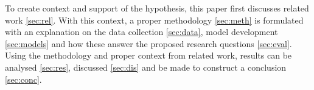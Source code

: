 To create context and support of the hypothesis, this paper first discusses related work \ref{sec:rel}. With this context, a proper methodology \ref{sec:meth} is formulated with an explanation on the data collection \ref{sec:data}, model development \ref{sec:models} and how these answer the proposed research questions \ref{sec:eval}. Using the methodology and proper context from related work, results can be analysed \ref{sec:res}, discussed \ref{sec:dis} and be made to construct a conclusion \ref{sec:conc}.


















